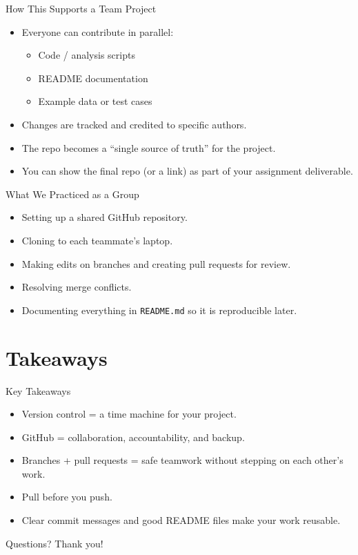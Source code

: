 \documentclass{beamer}
\begin{document}
\begin{frame}{How This Supports a Team Project}
  \begin{itemize}
    \item Everyone can contribute in parallel:
      \begin{itemize}
        \item Code / analysis scripts
        \item README documentation
        \item Example data or test cases
      \end{itemize}
    \item Changes are tracked and credited to specific authors.
    \item The repo becomes a ``single source of truth'' for the project.
    \item You can show the final repo (or a link) as part of your assignment deliverable.
  \end{itemize}
\end{frame}

\begin{frame}{What We Practiced as a Group}
  \begin{itemize}
    \item Setting up a shared GitHub repository.
    \item Cloning to each teammate's laptop.
    \item Making edits on branches and creating pull requests for review.
    \item Resolving merge conflicts.
    \item Documenting everything in \texttt{README.md} so it is reproducible later.
  \end{itemize}
\end{frame}

\section{Takeaways}

\begin{frame}{Key Takeaways}
  \begin{itemize}
    \item Version control = a time machine for your project.
    \item GitHub = collaboration, accountability, and backup.
    \item Branches + pull requests = safe teamwork without stepping on each other's work.
    \item Pull before you push.
    \item Clear commit messages and good README files make your work reusable.
  \end{itemize}
\end{frame}

\begin{frame}{Questions?}
  \centering
  \Large Thank you!
\end{frame}



\end{document}
